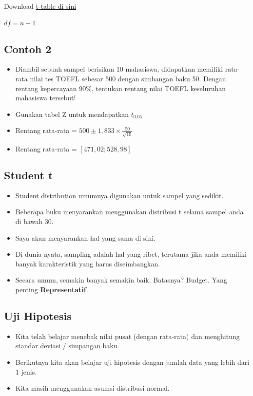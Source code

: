 \documentclass[
  letterpaper,
  DIV=11,
  numbers=noendperiod]{scrartcl}
\begin{document}
Download
\href{https://1drv.ms/b/s!AjelszXKKcmsifhDr8cYIgeuMVSIDw?e=ioiSHv}{t-table
di sini}

\(df=n-1\)

\subsection{Contoh 2}\label{contoh-2-2}

\begin{itemize}
\item
  Diambil sebuah sampel berisikan 10 mahasiswa, didapatkan memiliki
  rata-rata nilai tes TOEFL sebesar 500 dengan simbangan baku 50. Dengan
  rentang kepercayaan 90\%, tentukan rentang nilai TOEFL keseluruhan
  mahasiswa tersebut!
\item
  Gunakan tabel Z untuk mendapatkan \(t_{0.05}\)
\item
  Rentang rata-rata = \(500 \pm 1,833\times\frac{50}{\sqrt{10}}\)
\item
  Rentang rata-rata = \(\left[471,02;528,98\right]\)
\end{itemize}

\subsection{Student t}\label{student-t}

\begin{itemize}
\item
  Student distribution umumnya digunakan untuk sampel yang sedikit.
\item
  Beberapa buku menyarankan menggunakan distribusi t selama sampel anda
  di bawah 30.
\item
  Saya akan menyarankan hal yang sama di sini.
\item
  Di dunia nyata, sampling adalah hal yang ribet, terutama jika anda
  memiliki banyak karakteristik yang harus diseimbangkan.
\item
  Secara umum, semakin banyak semakin baik. Batasnya? Budget. Yang
  penting \textbf{Representatif}.
\end{itemize}

\subsection{Uji Hipotesis}\label{uji-hipotesis}

\begin{itemize}
\item
  Kita telah belajar menebak nilai pusat (dengan rata-rata) dan
  menghitung standar deviasi / simpangan baku.
\item
  Berikutnya kita akan belajar uji hipotesis dengan jumlah data yang
  lebih dari 1 jenis.
\item
  Kita masih menggunakan asumsi distribusi normal.
\end{itemize}
\end{document}
